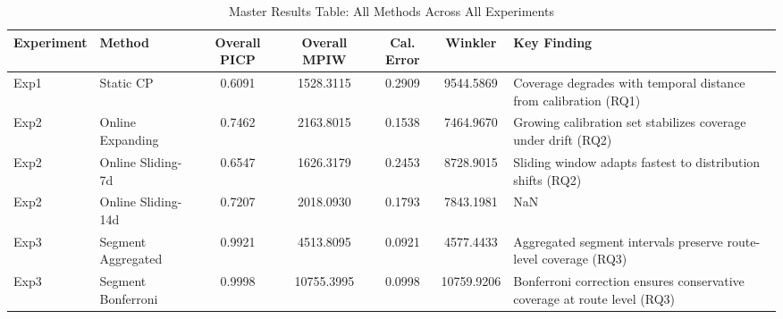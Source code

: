 \begin{table}
\caption{Master Results Table: All Methods Across All Experiments}
\label{tab:master_results}
\begin{tabular}{llccccl}
\toprule
Experiment & Method & Overall PICP & Overall MPIW & Cal. Error & Winkler & Key Finding \\
\midrule
Exp1 & Static CP & 0.6091 & 1528.3115 & 0.2909 & 9544.5869 & Coverage degrades with temporal distance from calibration (RQ1) \\
Exp2 & Online Expanding & 0.7462 & 2163.8015 & 0.1538 & 7464.9670 & Growing calibration set stabilizes coverage under drift (RQ2) \\
Exp2 & Online Sliding-7d & 0.6547 & 1626.3179 & 0.2453 & 8728.9015 & Sliding window adapts fastest to distribution shifts (RQ2) \\
Exp2 & Online Sliding-14d & 0.7207 & 2018.0930 & 0.1793 & 7843.1981 & NaN \\
Exp3 & Segment Aggregated & 0.9921 & 4513.8095 & 0.0921 & 4577.4433 & Aggregated segment intervals preserve route-level coverage (RQ3) \\
Exp3 & Segment Bonferroni & 0.9998 & 10755.3995 & 0.0998 & 10759.9206 & Bonferroni correction ensures conservative coverage at route level (RQ3) \\
\bottomrule
\end{tabular}
\end{table}
